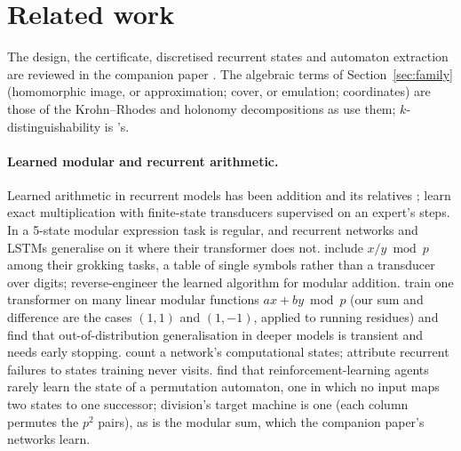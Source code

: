 \documentclass[11pt]{article}
\begin{document}
\section{Related work}
\label{sec:related}

The design, the certificate, discretised recurrent states and automaton extraction are reviewed in
the companion paper \citep{barkhuizen-2026-snapped-window-recurrence}. The algebraic terms of
Section~\ref{sec:family} (homomorphic image, or approximation; cover, or emulation; coordinates) are
those of the Krohn--Rhodes and holonomy decompositions as
\citet{egri-nagy-2015-computational-holonomy-decomposition,egri-nagy-2024-covering-lemma-transformation-semigroups}
use them; $k$-distinguishability is \citet{chow-1978-testing-software-design-finite-state-machines}'s.

\paragraph{Learned modular and recurrent arithmetic.} Learned arithmetic in recurrent models has been
addition and its relatives
\citep{kaiser-2015-neural-gpu,price-2016-neural-gpu-extensions-limitations,mohri-2026-rational-transductors};
\citet{papazov-2025-exact-learning-arithmetic-differentiable-agents} learn exact multiplication with
finite-state transducers supervised on an expert's steps. In
\citet{deletang-2022-neural-networks-chomsky-hierarchy} a 5-state modular expression task is regular,
and recurrent networks and LSTMs generalise on it where their transformer does not.
\citet{power-2022-grokking-small-algorithmic-datasets} include $x / y \bmod p$ among their grokking
tasks, a table of single symbols rather than a transducer over digits;
\citet{nanda-2023-progress-measures-grokking} reverse-engineer the learned algorithm for modular
addition. \citet{he-2024-learning-to-grok-modular-arithmetic} train one transformer on many linear
modular functions $a x + b y \bmod p$ (our sum and difference are the cases $(1, 1)$ and $(1, -1)$,
applied to running residues) and find that out-of-distribution generalisation in deeper models is
transient and needs early stopping. \citet{robinson-2020-extrapolating-algorithmic-learning} count a
network's computational states; \citet{buitrago-2025-length-generalization-recurrent-models}
attribute recurrent failures to states training never visits.
\citet{allchin-2026-reward-teach-state-hidden-automaton} find that reinforcement-learning agents
rarely learn the state of a permutation automaton, one in which no input maps two states to one
successor; division's target machine is one (each column permutes the $p^2$ pairs), as is the
modular sum, which the companion paper's networks learn.
\end{document}
